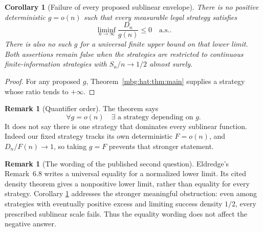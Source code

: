 \documentclass[11pt,letterpaper]{article}
\newtheorem{corollary}[theorem]{Corollary}
\theoremstyle{definition}
\newtheorem{remark}[theorem]{Remark}
\newcommand{\as}{\text{a.s.}}
\begin{document}
\begin{corollary}[Failure of every proposed sublinear envelope]
\label{mbg:hat:cor:no-envelope}
There is no positive deterministic \(g=o(n)\) such that every
measurable legal strategy satisfies
\[
  \liminf_{n\to\infty}\frac{D_n}{g(n)}\le0
  \quad\as.
\]
There is also no such \(g\) for a universal finite upper bound on
that lower limit. Both assertions remain false when the strategies
are restricted to continuous finite-information strategies with
\(S_n/n\to1/2\) almost surely.
\end{corollary}
\begin{proof}
For any proposed \(g\), Theorem~\ref{mbg:hat:thm:main} supplies a strategy
whose ratio tends to \(+\infty\).
\end{proof}

\begin{remark}[Quantifier order]
The theorem says
\[
  \forall g=o(n)\quad \exists\text{ a strategy depending on }g.
\]
It does not say there is one strategy that dominates every
sublinear function. Indeed our fixed strategy tracks its own
deterministic \(F=o(n)\), and \(D_n/F(n)\to1\), so taking
\(g=F\) prevents that stronger statement.
\end{remark}

\begin{remark}[The wording of the published second question]\label{mbg:hat:rem:wording}
Eldredge's Remark~6.8 writes a universal equality for a normalized
lower limit. Its cited density theorem gives a nonpositive lower
limit, rather than equality for every strategy. Corollary
\ref{mbg:hat:cor:no-envelope} addresses the stronger meaningful obstruction:
even among strategies with eventually positive excess and limiting
success density \(1/2\), every prescribed sublinear scale fails.
Thus the equality wording does not affect the negative answer.
\end{remark}
\end{document}
